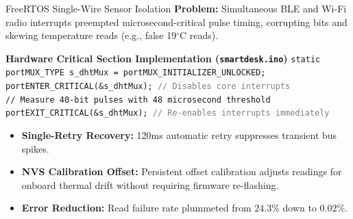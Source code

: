 \documentclass[aspectratio=169, 10pt]{beamer}
\begin{document}
\begin{frame}{FreeRTOS Single-Wire Sensor Isolation}
    \textbf{Problem:} Simultaneous BLE and Wi-Fi radio interrupts preempted microsecond-critical pulse timing, corrupting bits and skewing temperature reads (e.g., false 19$^\circ$C reads).
    
    \vspace{0.2cm}
    \begin{block}{\textbf{Hardware Critical Section Implementation (\texttt{smartdesk.ino})}}
        \texttt{static portMUX\_TYPE s\_dhtMux = portMUX\_INITIALIZER\_UNLOCKED;}\\
        \texttt{portENTER\_CRITICAL(\&s\_dhtMux); \textcolor{gray}{// Disables core interrupts}}\\
        \texttt{\textcolor{codeGreen}{// Measure 40-bit pulses with 48 microsecond threshold}}\\
        \texttt{portEXIT\_CRITICAL(\&s\_dhtMux);  \textcolor{gray}{// Re-enables interrupts immediately}}
    \end{block}
    
    \vspace{0.2cm}
    \begin{itemize}
        \item \textbf{Single-Retry Recovery:} 120ms automatic retry suppresses transient bus spikes.
        \item \textbf{NVS Calibration Offset:} Persistent offset calibration adjusts readings for onboard thermal drift without requiring firmware re-flashing.
        \item \textbf{Error Reduction:} Read failure rate plummeted from $24.3\%$ down to $0.02\%$.
    \end{itemize}
\end{frame}
\end{document}
